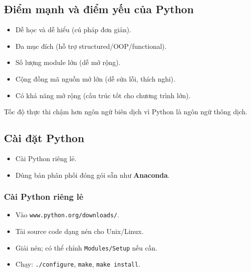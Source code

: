 \subsection{Điểm mạnh và điểm yếu của Python}

\begin{tinhchat}[title={Strengths}]
\begin{itemize}
  \item Dễ học và dễ hiểu (cú pháp đơn giản).
  \item Đa mục đích (hỗ trợ structured/OOP/functional).
  \item Số lượng module lớn (dễ mở rộng).
  \item Cộng đồng mã nguồn mở lớn (dễ sửa lỗi, thích nghi).
  \item Có khả năng mở rộng (cấu trúc tốt cho chương trình lớn).
\end{itemize}
\end{tinhchat}

\begin{luuy}[title={Weakness}]
Tốc độ thực thi chậm hơn ngôn ngữ biên dịch vì Python là ngôn ngữ thông dịch.
\end{luuy}

\subsection{Cài đặt Python}

\begin{phuongphap}[title={Hai cách cài}]
\begin{itemize}
  \item Cài Python riêng lẻ.
  \item Dùng bản phân phối đóng gói sẵn như \textbf{Anaconda}.
\end{itemize}
\end{phuongphap}

\subsubsection{Cài Python riêng lẻ}
\begin{phuongphap}[title={Unix/Linux (tóm tắt)}]
\begin{itemize}
  \item Vào \texttt{www.python.org/downloads/}.
  \item Tải source code dạng nén cho Unix/Linux.
  \item Giải nén; có thể chỉnh \texttt{Modules/Setup} nếu cần.
  \item Chạy: \texttt{./configure}, \texttt{make}, \texttt{make install}.
\end{itemize}
\end{phuongphap}

